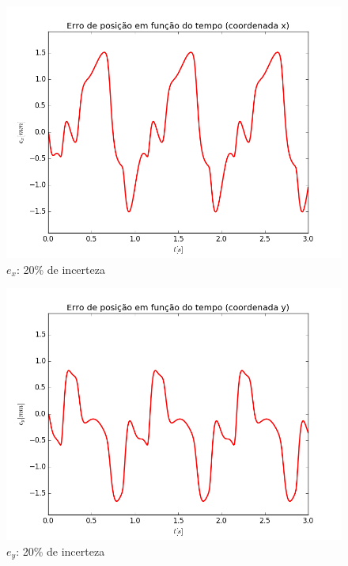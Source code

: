 \documentclass[]{politex}
\begin{document}
\begin{multicols}{2}
\begin{figure}[H]
	\centering
	\includegraphics[scale=0.42]{imagens/20/ex.png}  
	\caption{$e_x$: 20\% de incerteza}
	\label{fig:ex_20}
\end{figure}
\begin{figure}[H]
	\centering
	\includegraphics[scale=0.42]{imagens/20/ey.png}  
	\caption{$e_y$: 20\% de incerteza}
	\label{fig:ey_20}
\end{figure}
\end{multicols}
\end{document}
